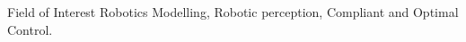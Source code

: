 \begin{rSection}{Field of Interest}
Robotics Modelling, Robotic perception, Compliant and Optimal Control.
\end{rSection}



